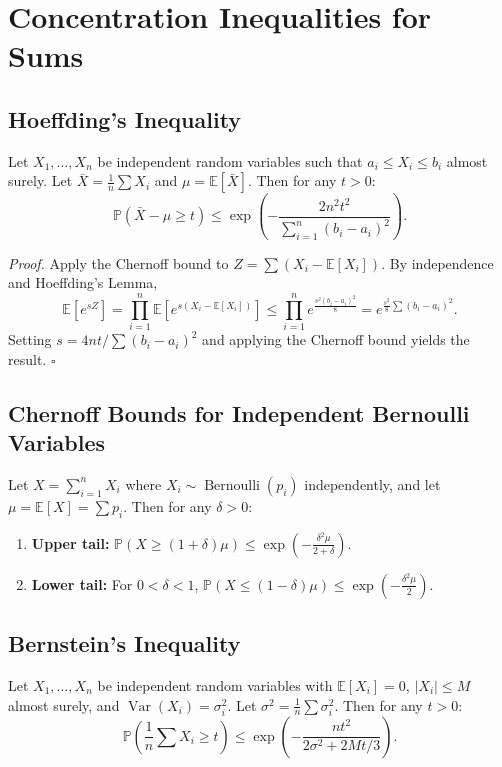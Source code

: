 \documentclass[11pt]{article}
\DeclareMathOperator{\Var}{Var}
\DeclareMathOperator{\Bernoulli}{Bernoulli}
\begin{document}
\section{Concentration Inequalities for Sums}

\subsection{Hoeffding's Inequality}
Let \(X_1, \dots, X_n\) be independent random variables such that \(a_i \le X_i \le b_i\) almost surely. Let \(\bar{X} = \frac{1}{n} \sum X_i\) and \(\mu = \mathbb{E}[\bar{X}]\). Then for any \(t > 0\):
\[
 \mathbb{P}(\bar{X} - \mu \ge t) \le \exp\left( - \frac{2n^2 t^2}{\sum_{i=1}^n (b_i - a_i)^2} \right). 
\]

\emph{Proof.} Apply the Chernoff bound to \(Z = \sum (X_i - \mathbb{E}[X_i])\). By independence and Hoeffding's Lemma,
\[
 \mathbb{E}[e^{sZ}] = \prod_{i=1}^n \mathbb{E}[e^{s(X_i - \mathbb{E}[X_i])}] \le \prod_{i=1}^n e^{\frac{s^2(b_i-a_i)^2}{8}} = e^{\frac{s^2}{8}\sum (b_i-a_i)^2}. 
\]
Setting \(s = 4nt / \sum (b_i-a_i)^2\) and applying the Chernoff bound yields the result. \(\square\)

\subsection{Chernoff Bounds for Independent Bernoulli Variables}
Let \(X = \sum_{i=1}^n X_i\) where \(X_i \sim \Bernoulli(p_i)\) independently, and let \(\mu = \mathbb{E}[X] = \sum p_i\). Then for any \(\delta > 0\):
\begin{enumerate}
    \item \textbf{Upper tail:} \(\mathbb{P}(X \ge (1+\delta)\mu) \le \exp\left( -\frac{\delta^2 \mu}{2+\delta} \right)\).
    \item \textbf{Lower tail:} For \(0 < \delta < 1\), \(\mathbb{P}(X \le (1-\delta)\mu) \le \exp\left( -\frac{\delta^2 \mu}{2} \right)\).
\end{enumerate}

\subsection{Bernstein's Inequality}
Let \(X_1, \dots, X_n\) be independent random variables with \(\mathbb{E}[X_i] = 0\), \(|X_i| \le M\) almost surely, and \(\Var(X_i) = \sigma_i^2\). Let \(\sigma^2 = \frac{1}{n}\sum \sigma_i^2\). Then for any \(t > 0\):
\[
 \mathbb{P}\left( \frac{1}{n}\sum X_i \ge t \right) \le \exp\left( - \frac{n t^2}{2\sigma^2 + 2Mt/3} \right). 
\]
\end{document}

